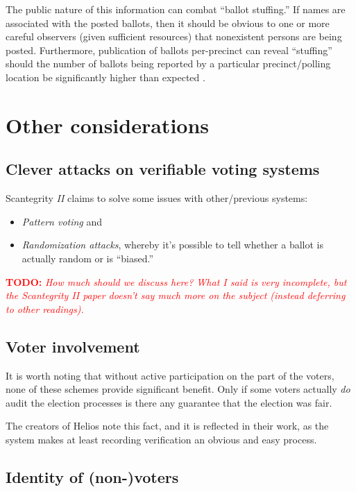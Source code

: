 \documentclass[10pt,twocolumn]{article}
\newcommand{\todo}[1]{\textcolor{red}{\textbf{TODO:} \emph{#1}}}
\newcommand{\term}[1]{\textit{#1}}
\begin{document}
The public nature of this information can combat ``ballot stuffing.'' If names are associated with
the posted ballots, then it should be obvious to one or more careful observers (given sufficient
resources) that nonexistent persons are being posted. Furthermore, publication of ballots
per-precinct can reveal ``stuffing'' should the number of ballots being reported by a particular
precinct/polling location be significantly higher than expected \cite{helios}.

\section{Other considerations}

\subsection{Clever attacks on verifiable voting systems}

Scantegrity \emph{II} claims to solve some issues with other/previous systems:
\begin{itemize}
	\item
		\term{Pattern voting} and
	\item
		\term{Randomization attacks}, whereby it's possible to tell whether a ballot is actually random
		or is ``biased.''
\end{itemize}

\todo{How much should we discuss here? What I said is very incomplete, but the Scantegrity II paper
doesn't say much more on the subject (instead deferring to other readings).}

\subsection{Voter involvement}

It is worth noting that without active participation on the part of the voters, none of these
schemes provide significant benefit. Only if some voters actually \emph{do} audit the election
processes is there any guarantee that the election was fair.

The creators of Helios note this fact, and it is reflected in their work, as the system makes at
least recording verification an obvious and easy process.

\subsection{Identity of (non-)voters}
\end{document}
